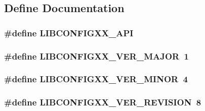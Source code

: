 \subsection{Define Documentation}
\hypertarget{libconfig_8h_09_09_a8664a5f8533ae4aecd48e7763f2a4839}{
\subsubsection[{LIBCONFIGXX\_\-API}]{\setlength{\rightskip}{0pt plus 5cm}\#define LIBCONFIGXX\_\-API}}
\label{libconfig_8h_09_09_a8664a5f8533ae4aecd48e7763f2a4839}
\hypertarget{libconfig_8h_09_09_ab687fb0e058a7fcfc86a6a05f77dd545}{
\subsubsection[{LIBCONFIGXX\_\-VER\_\-MAJOR}]{\setlength{\rightskip}{0pt plus 5cm}\#define LIBCONFIGXX\_\-VER\_\-MAJOR~1}}
\label{libconfig_8h_09_09_ab687fb0e058a7fcfc86a6a05f77dd545}
\hypertarget{libconfig_8h_09_09_a9a7835a0747b2ad8db8a3081a3c85f3c}{
\subsubsection[{LIBCONFIGXX\_\-VER\_\-MINOR}]{\setlength{\rightskip}{0pt plus 5cm}\#define LIBCONFIGXX\_\-VER\_\-MINOR~4}}
\label{libconfig_8h_09_09_a9a7835a0747b2ad8db8a3081a3c85f3c}
\hypertarget{libconfig_8h_09_09_a2e8b8ffb97a61e09a27ae2ec8686b50b}{
\subsubsection[{LIBCONFIGXX\_\-VER\_\-REVISION}]{\setlength{\rightskip}{0pt plus 5cm}\#define LIBCONFIGXX\_\-VER\_\-REVISION~8}}
\label{libconfig_8h_09_09_a2e8b8ffb97a61e09a27ae2ec8686b50b}
